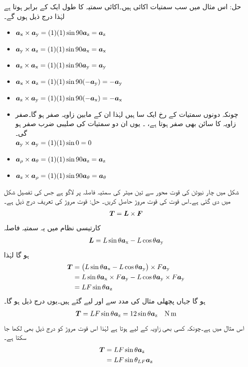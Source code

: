 حل: اس مثال میں سب سمتیات اکائی ہیں۔اکائی سمتیہ کا طول ایک کے برابر ہوتا ہے لہٰذا درج ذیل ہوں گے۔
\begin{itemize}
\item
$\ax \times \ay=(1)(1) \sin 90 \az =\az$
\item
$\ay \times \az=(1)(1) \sin 90 \ax =\ax$
\item
$\az \times \ax=(1)(1) \sin 90 \ay =\ay$
\item
$\ax \times \az=(1)(1) \sin 90 (-\ay) =-\ay$
\item
$\az \times \ay=(1)(1) \sin 90 (-\ax) =-\ax$
\item
چونکہ دونوں سمتیات کے رخ ایک سا  ہیں لہٰذا ان کے مابین زاویہ صفر ہو گا۔صفر زاویہ کا سائن بھی صفر ہوتا ہے، ۔ یوں ان دو سمتیات  کی صلیبی ضرب صفر ہو گی۔\\
$\ay \times \ay=(1)(1) \sin 0  =0$
\item
$\arho \times \atheta=(1)(1) \sin 90  \az =\az$
\item
$\az \times \arho=(1)(1) \sin 90 \atheta =\atheta $
\end{itemize}
%
شکل  میں  چار نیوٹن کی قوت  محور سے تین میٹر کی سمتیہ فاصلہ   پر لاگو ہے جس  کی تفصیل شکل میں دی گئی ہے۔اس قوت کی قوت مروڑ  حاصل کریں۔
حل:	قوت مروڑ  کی تعریف درج ذیل  ہے۔
\begin{align}
\kvec{T}=\kvec{L} \times \kvec{F}
\end{align}
کارتیسی نظام میں یہ سمتیہ فاصلہ
\begin{align}
\kvec{L}=L \sin \theta \ax-L \cos \theta \ay
\end{align}
ہو گا لہٰذا
\begin{align*}
\kvec{T}&=\left(L \sin \theta \ax-L \cos \theta \ay \right) \times F \ay\\
&=L \sin \theta \ax \times F \ay-L \cos \theta \ay \times F \ay\\
&= L F \sin \theta \az
\end{align*} 
ہو گا جہاں پچھلی مثال کی مدد سے  اور  لیے گئے ہیں۔یوں درج ذیل ہو گا۔
\begin{align*}
\kvec{T}= L F \sin \theta \az=12 \sin \theta \az \quad \si{\newton \meter}
\end{align*}
اس مثال میں  ہے۔چونکہ کسی بھی زاویہ    کے لیے  ہوتا ہے لہٰذا اس قوت مروڑ کو درج ذیل بھی لکھا جا سکتا ہے۔
\begin{align*}
\kvec{T}&=LF\sin \theta \az\\
&=L F \sin \theta_{LF}\az
\end{align*}
